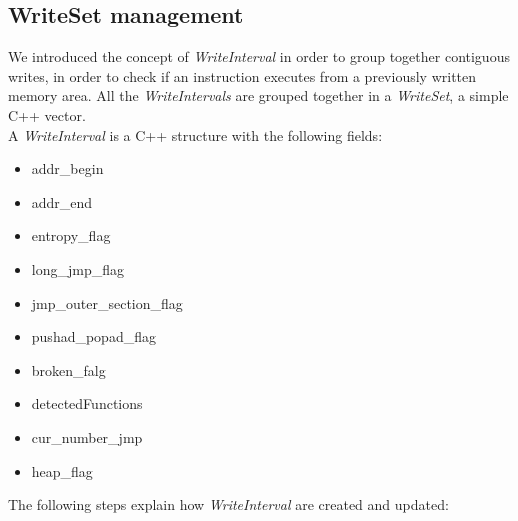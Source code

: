 \subsection{WriteSet management}
We introduced the concept of \textit{WriteInterval} in order to group together contiguous writes, in order to check if an instruction executes from a previously written memory area. All the \textit{WriteIntervals} are grouped together in a \textit{WriteSet}, a simple C++ vector.\\
A \textit{WriteInterval} is a C++ structure with the following fields:
\begin{itemize}
\item addr\_begin
\item addr\_end
\item entropy\_flag
\item long\_jmp\_flag
\item jmp\_outer\_section\_flag
\item pushad\_popad\_flag
\item broken\_falg
\item detectedFunctions
\item cur\_number\_jmp
\item heap\_flag
\end{itemize}
The following steps explain how \textit{WriteInterval} are created and updated:
